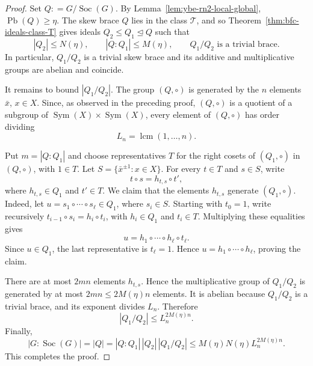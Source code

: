 \documentclass[10pt,a4paper]{amsart}
\numberwithin{equation}{section}
\newcommand{\Pb}{\operatorname{Pb} }
\newcommand{\Soc}{\operatorname{Soc} }
\begin{document}
\begin{proof}
Set $Q: =G/\Soc(G)$. By
Lemma~\ref{lem:ybe-rn2-local-global}, $\Pb(Q)\geqslant\eta$. The skew brace $Q$
lies in the class $\mathcal{T}$, and  so
Theorem~\ref{thm:bfc-ideals-class-T} gives ideals
$Q_2\leqslant Q_1\trianglelefteq Q$ such that
$$
|Q_2|\leqslant N(\eta),\qquad |Q:Q_1|\leqslant M(\eta),
\qquad Q_1/Q_2\text{ is a trivial brace}.
$$
In particular, $Q_1/Q_2$ is a trivial skew brace and its additive and
multiplicative groups are abelian and coincide.

It remains to bound $|Q_1/Q_2|$. The group $(Q,\circ)$ is generated by the
$n$ elements $\bar x$, $x\in X$. Since, as observed in the preceding proof, $(Q,\circ)$ is a quotient of a subgroup of
$\operatorname{Sym}(X)\times\operatorname{Sym}(X)$, every element of
$(Q,\circ)$ has order dividing
$$
L_n=\operatorname{lcm}(1,\ldots,n).
$$

Put $m=|Q:Q_1|$ and choose representatives $T$ for the right cosets of
$(Q_1,\circ)$ in $(Q,\circ)$, with $1\in T$. Let
$S=\{\bar x^{\pm1}:x\in X\}$. For every $t\in T$ and $s\in S$, write
$$
t\circ s=h_{t,s}\circ t',
$$
where $h_{t,s}\in Q_1$ and $t'\in T$. We claim that the elements $h_{t,s}$
generate $(Q_1,\circ)$. Indeed, let
$u=s_1\circ\cdots\circ s_\ell\in Q_1$, where $s_i\in S$. Starting with
$t_0=1$, write recursively
$t_{i-1}\circ s_i=h_i\circ t_i$, with $h_i\in Q_1$ and $t_i\in T$.
Multiplying these equalities gives
$$
u=h_1\circ\cdots\circ h_\ell\circ t_\ell.
$$
Since $u\in Q_1$, the last representative is $t_\ell=1$. Hence
$u=h_1\circ\cdots\circ h_\ell$, proving the claim.

There are at most $2mn$ elements $h_{t,s}$. Hence the multiplicative group of
$Q_1/Q_2$ is generated by at most
$2mn\leqslant2M(\eta)n$ elements. It is abelian because $Q_1/Q_2$ is a trivial
brace, and its exponent divides $L_n$. Therefore
$$
|Q_1/Q_2|\leqslant L_n^{2M(\eta)n}.
$$
Finally,
$$
|G:\Soc(G)|=|Q|=|Q:Q_1|\,|Q_2|\,|Q_1/Q_2|
\leqslant M(\eta)N(\eta)L_n^{2M(\eta)n}.
$$
This completes the proof.
\end{proof}
\end{document}
